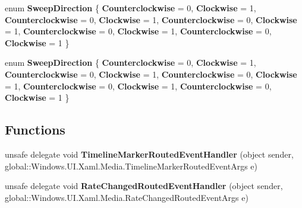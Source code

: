 \begin{DoxyCompactItemize}
enum {\bfseries Sweep\+Direction} \{ \newline
{\bfseries Counterclockwise} = 0, 
{\bfseries Clockwise} = 1, 
{\bfseries Counterclockwise} = 0, 
{\bfseries Clockwise} = 1, 
\newline
{\bfseries Counterclockwise} = 0, 
{\bfseries Clockwise} = 1, 
{\bfseries Counterclockwise} = 0, 
{\bfseries Clockwise} = 1, 
\newline
{\bfseries Counterclockwise} = 0, 
{\bfseries Clockwise} = 1
 \}
\item 
\mbox{\label{namespace_windows_1_1_u_i_1_1_xaml_1_1_media_a38a86a3bb843209bfd6ac407e1f0ca75}} 
enum {\bfseries Sweep\+Direction} \{ \newline
{\bfseries Counterclockwise} = 0, 
{\bfseries Clockwise} = 1, 
{\bfseries Counterclockwise} = 0, 
{\bfseries Clockwise} = 1, 
\newline
{\bfseries Counterclockwise} = 0, 
{\bfseries Clockwise} = 1, 
{\bfseries Counterclockwise} = 0, 
{\bfseries Clockwise} = 1, 
\newline
{\bfseries Counterclockwise} = 0, 
{\bfseries Clockwise} = 1
 \}
\end{DoxyCompactItemize}
\subsection*{Functions}
\begin{DoxyCompactItemize}
\item 
\mbox{\label{namespace_windows_1_1_u_i_1_1_xaml_1_1_media_a263e328cf9040c986fbf2730388c3666}} 
unsafe delegate void {\bfseries Timeline\+Marker\+Routed\+Event\+Handler} (object sender, global\+::\+Windows.\+U\+I.\+Xaml.\+Media.\+Timeline\+Marker\+Routed\+Event\+Args e)
\item 
\mbox{\label{namespace_windows_1_1_u_i_1_1_xaml_1_1_media_a0aca20dc1e03fda48745fb58302315c0}} 
unsafe delegate void {\bfseries Rate\+Changed\+Routed\+Event\+Handler} (object sender, global\+::\+Windows.\+U\+I.\+Xaml.\+Media.\+Rate\+Changed\+Routed\+Event\+Args e)
\end{DoxyCompactItemize}
